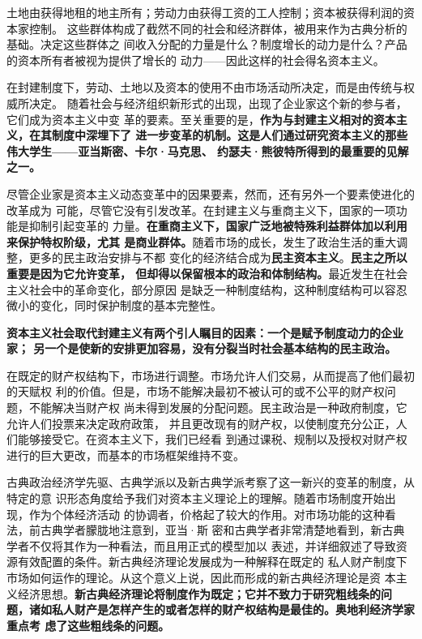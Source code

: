 土地由获得地租的地主所有；劳动力由获得工资的工人控制；资本被获得利润的资本家控制。
这些群体构成了截然不同的社会和经济群体，被用来作为古典分析的基础。决定这些群体之
间收入分配的力量是什么？制度增长的动力是什么？产品的资本所有者被视为提供了增长的
动力——因此这样的社会得名资本主义。

在封建制度下，劳动、土地以及资本的使用不由市场活动所决定，而是由传统与权威所决定。
随着社会与经济组织新形式的出现，出现了企业家这个新的参与者，它们成为资本主义中变
革的要素。至关重要的是，\textbf{作为与封建主义相对的资本主义，在其制度中深埋下了
  进一步变革的机制。这是人们通过研究资本主义的那些伟大学生——亚当斯密、卡尔·马克思、
  约瑟夫·熊彼特所得到的最重要的见解之一。}

尽管企业家是资本主义动态变革中的因果要素，然而，还有另外一个要素使进化的改革成为
可能，尽管它没有引发改革。在封建主义与重商主义下，国家的一项功能是抑制引起变革的
力量。\textbf{在重商主义下，国家广泛地被特殊利益群体加以利用来保护特权阶级，尤其
  是商业群体。}随着市场的成长，发生了政治生活的重大调整，更多的民主政治安排与不都
变化的经济结合成为\textbf{民主资本主义}。\textbf{民主之所以重要是因为它允许变革，
  但却得以保留根本的政治和体制结构。}最近发生在社会主义社会中的革命变化，部分原因
是缺乏一种制度结构，这种制度结构可以容忍微小的变化，同时保护制度的基本完整性。

\textbf{资本主义社会取代封建主义有两个引人瞩目的因素：一个是赋予制度动力的企业家；
  另一个是使新的安排更加容易，没有分裂当时社会基本结构的民主政治。}

在既定的财产权结构下，市场进行调整。市场允许人们交易，从而提高了他们最初的天赋权
利的价值。但是，市场不能解决最初不被认可的或不公平的财产权问题，不能解决当财产权
尚未得到发展的分配问题。民主政治是一种政府制度，它允许人们投票来决定政府政策，
并且更改现有的财产权，以使制度充分公正，人们能够接受它。在资本主义下，我们已经看
到通过课税、规制以及授权对财产权进行的巨大更改，而基本的市场框架维持不变。

古典政治经济学先驱、古典学派以及新古典学派考察了这一新兴的变革的制度，从特定的意
识形态角度给予我们对资本主义理论上的理解。随着市场制度开始出现，作为个体经济活动
的协调者，价格起了较大的作用。对市场功能的这种看法，前古典学者朦胧地注意到，亚当·斯
密和古典学者非常清楚地看到，新古典学者不仅将其作为一种看法，而且用正式的模型加以
表述，并详细叙述了导致资源有效配置的条件。新古典经济理论发展成为一种解释在既定的
私人财产制度下市场如何运作的理论。从这个意义上说，因此而形成的新古典经济理论是资
本主义经济思想。\textbf{新古典经济理论将制度作为既定；它并不致力于研究粗线条的问
  题，诸如私人财产是怎样产生的或者怎样的财产权结构是最佳的。奥地利经济学家重点考
  虑了这些粗线条的问题。}

